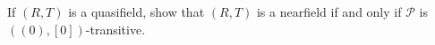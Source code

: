 If $(R, T)$ is a quasifield, show that $(R, T)$ is a nearfield if and only if $\mathcal{P}$ is $((0), [0])$-transitive.
